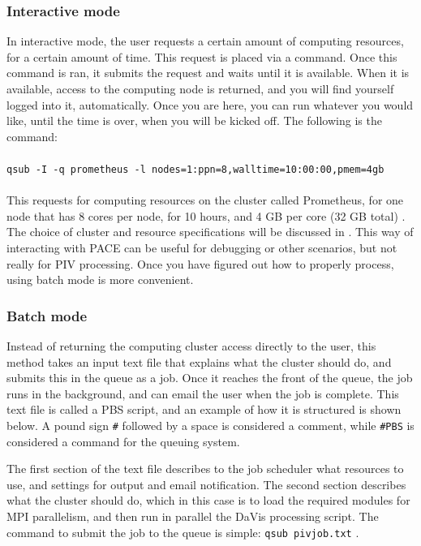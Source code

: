 \documentclass{article}
\begin{document}
	\subsubsection{Interactive mode}
	In interactive mode, the user requests a certain amount of computing resources, for a certain amount of time.  This request is placed via a command.  Once this command is ran, it submits the request and waits until it is available.  When it is available, access to the computing node is returned, and you will find yourself logged into it, automatically.  Once you are here, you can run whatever you would like, until the time is over, when you will be kicked off.  The following is the command:
	\\ \\
	\texttt{qsub -I -q prometheus -l nodes=1:ppn=8,walltime=10:00:00,pmem=4gb}
	\\  \\
	This requests for computing resources on the cluster called Prometheus, for one node that has 8 cores per node, for 10 hours, and 4 GB per core (32 GB total) .  The choice of cluster and resource specifications will be discussed in .  This way of interacting with PACE can be useful for debugging or other scenarios, but not really for PIV processing.  Once you have figured out how to properly process, using batch mode is more convenient.
	
	\subsubsection{Batch mode}
	Instead of returning the computing cluster access directly to the user, this method takes an input text file that explains what the cluster should do, and submits this in the queue as a job.  Once it reaches the front of the queue, the job runs in the background, and can email the user when the job is complete.  This text file is called  a PBS script, and an example of how it is structured is shown below.  A pound sign \texttt{\#} followed by a space is considered a comment, while \texttt{\#PBS} is considered a command for the queuing system.
	
	
	The first section of the text file describes to the job scheduler what resources to use, and settings for output and email notification.  The second section describes what the cluster should do, which in this case is to load the required modules for MPI parallelism, and then run in parallel the DaVis processing script.  The command to submit the job to the queue is simple: \texttt{qsub pivjob.txt} .
	
\end{document}
